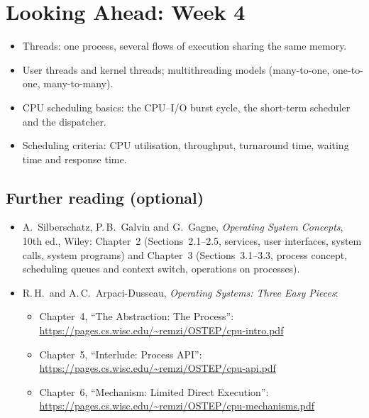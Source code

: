 \documentclass[11pt,a4paper]{article}
\begin{document}
\section{Looking Ahead: Week 4}

\begin{itemize}
  \item Threads: one process, several flows of execution sharing the same memory.
  \item User threads and kernel threads; multithreading models (many-to-one, one-to-one, many-to-many).
  \item CPU scheduling basics: the CPU--I/O burst cycle, the short-term scheduler and the dispatcher.
  \item Scheduling criteria: CPU utilisation, throughput, turnaround time, waiting time and response time.
\end{itemize}

\subsection*{Further reading (optional)}
\begin{itemize}
  \item A.\ Silberschatz, P.\,B.\ Galvin and G.\ Gagne, \emph{Operating System Concepts}, 10th ed., Wiley: Chapter~2 (Sections~2.1--2.5, services, user interfaces, system calls, system programs) and Chapter~3 (Sections~3.1--3.3, process concept, scheduling queues and context switch, operations on processes).
  \item R.\,H.\ and A.\,C.\ Arpaci-Dusseau, \emph{Operating Systems: Three Easy Pieces}:
    \begin{itemize}
      \item Chapter~4, ``The Abstraction: The Process'': \url{https://pages.cs.wisc.edu/~remzi/OSTEP/cpu-intro.pdf}
      \item Chapter~5, ``Interlude: Process API'': \url{https://pages.cs.wisc.edu/~remzi/OSTEP/cpu-api.pdf}
      \item Chapter~6, ``Mechanism: Limited Direct Execution'': \url{https://pages.cs.wisc.edu/~remzi/OSTEP/cpu-mechanisms.pdf}
    \end{itemize}
\end{itemize}
\end{document}

